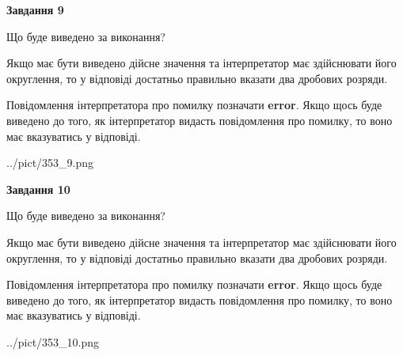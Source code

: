 \documentclass[12pt, ukrainian]{article}
\begin{document}
{\begin {Large}
{\begin {center}\textbf{Завдання 9}\end {center}}\par
Що буде виведено за виконання? \par

Якщо має бути виведено дійсне значення та інтерпретатор має здійснювати його округлення, 
то у відповіді достатньо правильно вказати два дробових розряди.

Повідомлення інтерпретатора про помилку позначати \textbf{error}.
Якщо щось буде виведено до того, як інтерпретатор видасть повідомлення про помилку, 
то воно має вказуватись у відповіді. \par

\begin{center}
	{../pict/353_9.png}
\end{center}
\newpage

{\begin {center}\textbf{Завдання 10}\end {center}}\par
Що буде виведено за виконання? \par

Якщо має бути виведено дійсне значення та інтерпретатор має здійснювати його округлення, 
то у відповіді достатньо правильно вказати два дробових розряди.

Повідомлення інтерпретатора про помилку позначати \textbf{error}.
Якщо щось буде виведено до того, як інтерпретатор видасть повідомлення про помилку, 
то воно має вказуватись у відповіді. \par

\begin{center}
	{../pict/353_10.png}
\end{center}
\newpage

\end {Large}}
\end{document}
